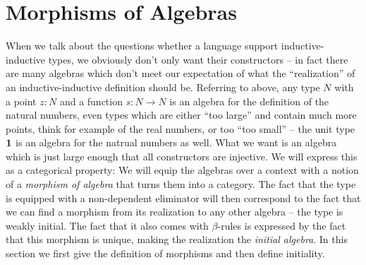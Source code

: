 
\section{Morphisms of Algebras}

When we talk about the questions whether a language support inductive-inductive
types, we obviously don't only want their constructors --
in fact there are many algebras which don't meet our expectation of what the
``realization'' of an inductive-inductive definition should be.
Referring to  above, any type $N$ with a point $z : N$ and
a function $s : N \to N$ is an algebra for the definition of the natural numbers,
even types which are either ``too large'' and contain much more points,
think for example of the real numbers,
or too ``too small'' -- the unit type $\mathbf{1}$ is an algebra for the natrual numbers
as well.
What we want is an algebra which is just large enough that all
constructors are injective.
We will express this as a categorical property:
We will equip the algebras over a context with a notion of a \emph{morphism of algebra}
that turns them into a category.
The fact that the type is equipped with a non-dependent eliminator will then
correspond to the fact that we can find a morphism from its
realization to any other algebra -- the type is weakly initial.
The fact that it also comes with $\beta$-rules is expressed by the fact
that this morphism is unique, making the realization the \emph{initial algebra}.
In this section we first give the definition of morphisms and then define
initiality.

